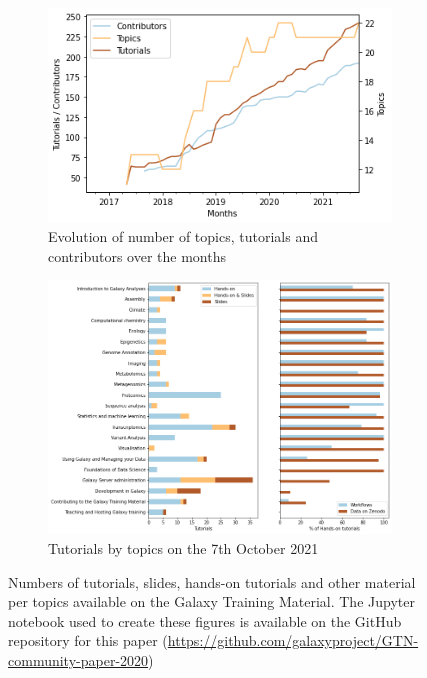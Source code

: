\documentclass[10pt,letterpaper]{article}
\begin{document}
\begin{figure}[!ht]
    \centering
    \begin{subfigure}[b]{0.4\textwidth}
         \centering
         \includegraphics[width=\textwidth]{images/training-material-evolutions.png}
    \caption{Evolution of number of topics, tutorials and contributors over the months}
         \label{fig:material-evolution}
    \end{subfigure}
    \hfill
    \begin{subfigure}[b]{0.5\textwidth}
         \centering
         \includegraphics[width=\textwidth]{images/training-material-number.png}
         \caption{Tutorials by topics on the 7th October 2021}
         \label{fig:material-number}
    \end{subfigure}
	\caption{Numbers of tutorials, slides, hands-on tutorials and other material per topics available on the Galaxy Training Material. The Jupyter notebook used to create these figures is available on the GitHub repository for this paper (\url{https://github.com/galaxyproject/GTN-community-paper-2020})}
	\label{fig:material}
\end{figure}
\end{document}
